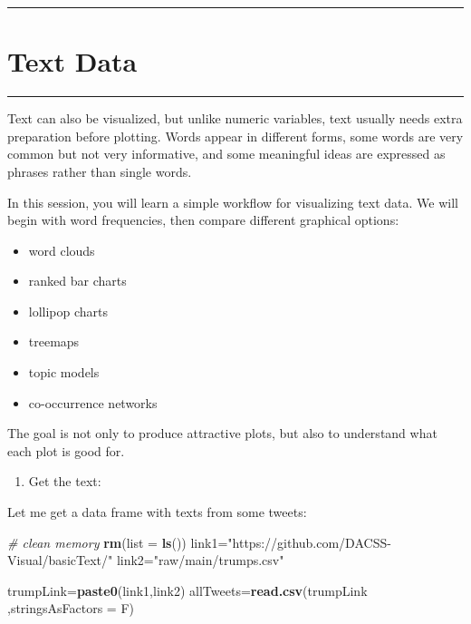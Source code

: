 \documentclass[
]{article}
\author{}
\date{\vspace{-2.5em}}
\newenvironment{Shaded}{\begin{snugshade}}{\end{snugshade}}
\newcommand{\AttributeTok}[1]{\textcolor[rgb]{0.13,0.29,0.53}{#1}}
\newcommand{\CommentTok}[1]{\textcolor[rgb]{0.56,0.35,0.01}{\textit{#1}}}
\newcommand{\FunctionTok}[1]{\textcolor[rgb]{0.13,0.29,0.53}{\textbf{#1}}}
\newcommand{\NormalTok}[1]{#1}
\newcommand{\OtherTok}[1]{\textcolor[rgb]{0.56,0.35,0.01}{#1}}
\newcommand{\StringTok}[1]{\textcolor[rgb]{0.31,0.60,0.02}{#1}}
\providecommand{\tightlist}{%
  \setlength{\itemsep}{0pt}\setlength{\parskip}{0pt}}
\begin{document}
\begin{center}\rule{0.5\linewidth}{0.5pt}\end{center}

\section{Text Data}\label{text-data}

\begin{center}\rule{0.5\linewidth}{0.5pt}\end{center}

Text can also be visualized, but unlike numeric variables, text usually
needs extra preparation before plotting. Words appear in different
forms, some words are very common but not very informative, and some
meaningful ideas are expressed as phrases rather than single words.

In this session, you will learn a simple workflow for visualizing text
data. We will begin with word frequencies, then compare different
graphical options:

\begin{itemize}
\tightlist
\item
  word clouds
\item
  ranked bar charts
\item
  lollipop charts
\item
  treemaps
\item
  topic models
\item
  co-occurrence networks
\end{itemize}

The goal is not only to produce attractive plots, but also to understand
what each plot is good for.

\begin{enumerate}
\def\labelenumi{\arabic{enumi}.}
\tightlist
\item
  Get the text:
\end{enumerate}

Let me get a data frame with texts from some tweets:

\begin{Shaded}
\begin{Highlighting}[]
\CommentTok{\# clean memory}
\FunctionTok{rm}\NormalTok{(}\AttributeTok{list =} \FunctionTok{ls}\NormalTok{()) }
\NormalTok{link1}\OtherTok{=}\StringTok{"https://github.com/DACSS{-}Visual/basicText/"}
\NormalTok{link2}\OtherTok{=}\StringTok{"raw/main/trumps.csv"}

\NormalTok{trumpLink}\OtherTok{=}\FunctionTok{paste0}\NormalTok{(link1,link2)}
\NormalTok{allTweets}\OtherTok{=}\FunctionTok{read.csv}\NormalTok{(trumpLink ,}\AttributeTok{stringsAsFactors =}\NormalTok{ F)}
\end{Highlighting}
\end{Shaded}
\end{document}
